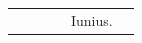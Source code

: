 \documentclass[openany]{book}
\renewcommand{\\}{\par\hspace*{.1em}} %
\begin{document}
\begin{center}
\begin{tabular}{l | l | l | r | l l}
& & & & \color{Red} Iunius. \\

\end{tabular}
\end{center}
\end{document}
